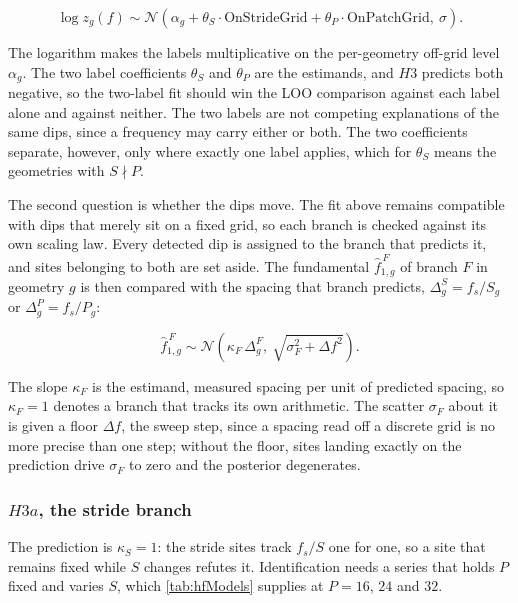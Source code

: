 \begin{equation}
\label{eq:d2sites}
\log z_g(f) \sim \mathcal{N}\!\left(
\alpha_g + \theta_S \cdot \text{OnStrideGrid} + \theta_P \cdot \text{OnPatchGrid},\ \sigma
\right).
\end{equation}

The logarithm makes the labels multiplicative on the per-geometry off-grid level $\alpha_g$. The two label coefficients $\theta_S$ and $\theta_P$ are the estimands, and $H3$ predicts both negative, so the two-label fit should win the LOO comparison against each label alone and against neither. The two labels are not competing explanations of the same dips, since a frequency may carry either or both. The two coefficients separate, however, only where exactly one label applies, which for $\theta_S$ means the geometries with $S \nmid P$.

The second question is whether the dips move. The fit above remains compatible with dips that merely sit on a fixed grid, so each branch is checked against its own scaling law. Every detected dip is assigned to the branch that predicts it, and sites belonging to both are set aside. The fundamental $\hat f^{\,F}_{1,g}$ of branch $F$ in geometry $g$ is then compared with the spacing that branch predicts, $\Delta^S_g=f_s/S_g$ or $\Delta^P_g=f_s/P_g$:

\begin{equation}
\label{eq:d2move}
\hat f^{\,F}_{1,g} \sim \mathcal{N}\!\left(
\kappa_F \,\Delta^F_g,\ \sqrt{\sigma_F^2+\Delta f^2}
\right).
\end{equation}

The slope $\kappa_F$ is the estimand, measured spacing per unit of predicted spacing, so $\kappa_F=1$ denotes a branch that tracks its own arithmetic. The scatter $\sigma_F$ about it is given a floor $\Delta f$, the sweep step, since a spacing read off a discrete grid is no more precise than one step; without the floor, sites landing exactly on the prediction drive $\sigma_F$ to zero and the posterior degenerates.

\subsubsection{$H3a$, the stride branch}
The prediction is $\kappa_S=1$: the stride sites track $f_s/S$ one for one, so a site that remains fixed while $S$ changes refutes it. Identification needs a series that holds $P$ fixed and varies $S$, which \autoref{tab:hfModels} supplies at $P{=}16$, $24$ and $32$.

